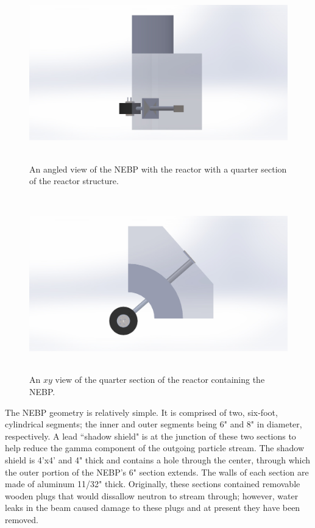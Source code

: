 \begin{figure}[htb]
\centering
\includegraphics[height=3in]{tex/figures/solidworksangled.jpg}
\caption[Solidworks Angled NEBP]{An angled view of the NEBP with the reactor with a quarter section of the reactor structure.}
\label{fig:solidworksangled}
\end{figure}

\begin{figure}[htb]
\centering
\includegraphics[height=3in]{tex/figures/solidworksxy.jpg}
\caption[Solidworks $XY$]{An $xy$ view of the quarter section of the reactor containing the NEBP.}
\label{fig:solidworksxy}
\end{figure}


The NEBP geometry is relatively simple.
It is comprised of two, six-foot, cylindrical segments; the inner and outer segments being 6" and 8" in diameter, respectively.
A lead ``shadow shield" is at the junction of these two sections to help reduce the gamma component of the outgoing particle stream.
The shadow shield is 4'x4' and 4" thick and contains a hole through the center, through which the outer portion of the NEBP's 6" section extends.
The walls of each section are made of aluminum 11/32" thick.
Originally, these sections contained removable wooden plugs that would dissallow neutron to stream through; however, water leaks in the beam caused damage to these plugs and at present they have been removed.


